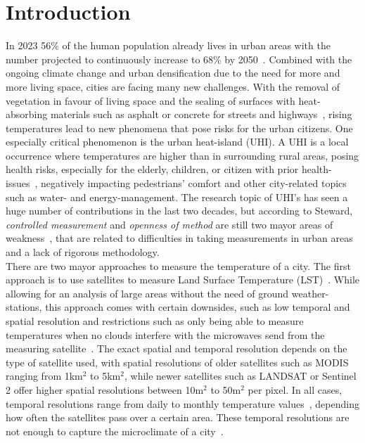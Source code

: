 
\chapter{Introduction}
\label{chap:Introduction}

In 2023 56\% of the human population already lives in urban areas with the number projected to continuously  increase to 68\% by 2050~\cite{who2018projections}. Combined with the ongoing climate change and urban densification due to the need for more and more living space, cities are facing many new challenges. With the removal of vegetation in favour of living space and the sealing of surfaces with heat-absorbing materials such as asphalt or concrete for streets and highways~\cite{gret2020urban}, rising temperatures lead to new phenomena that pose risks for the urban citizens. One especially critical phenomenon is the urban heat-island (UHI). A UHI is a local occurrence where temperatures are higher than in surrounding rural areas, posing health risks, especially for the elderly, children, or citizen with prior health-issues~\cite{martin2015alternative}, negatively impacting pedestrians' comfort and other city-related topics such as water- and energy-management. The research topic of UHI's has seen a huge number of contributions in the last two decades, but according to Steward, \textit{controlled measurement} and \textit{openness of method} are still two mayor areas of weakness~\cite{stewart2011systematic}, that are related to difficulties in taking measurements in urban areas~\cite{oke2006guideline} and a lack of rigorous methodology.\\
There are two mayor approaches to measure the temperature of a city. The first approach is to use satellites to measure Land Surface Temperature (LST)~\cite{peng2012surface}. While allowing for an analysis of large areas without the need of ground weather-stations, this approach comes with certain downsides, such as low temporal and spatial resolution and restrictions such as only being able to measure temperatures when no clouds interfere with the microwaves send from the measuring satellite~\cite{zhang2015estimation}. The exact spatial and temporal resolution depends on the type of satellite used, with spatial resolutions of older satellites such as MODIS ranging from 1km$^2$ to 5km$^2$, while newer satellites such as LANDSAT or Sentinel 2 offer higher spatial resolutions between 10m$^2$ to 50m$^2$ per pixel. In all cases, temporal resolutions range from daily to monthly temperature values~\cite{ghent2022esalst}, depending how often the satellites pass over a certain area. These temporal resolutions are not enough to capture the microclimate of a city~\cite{voelkel2017towards}.\\
